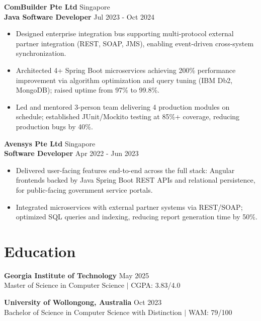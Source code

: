 \documentclass[10pt,a4paper]{article}
\newcommand{\resumeSubheading}[4]{
    {\sffamily\bfseries #1} \hfill {\small #2} \\
    \vspace{1pt}
    \textbf{#3} \hfill {\small #4}
}
\begin{document}
\resumeSubheading
{ComBuilder Pte Ltd}{Singapore}
{Java Software Developer}{Jul 2023 - Oct 2024}
\vspace{-6pt}
\begin{itemize}[leftmargin=0.18in, label={\textbullet}, itemsep=1pt, parsep=0pt, topsep=3pt]
    \item Designed enterprise integration bus supporting multi-protocol external partner integration (REST, SOAP, JMS), enabling event-driven cross-system synchronization.
    \item Architected 4+ Spring Boot microservices achieving 200\% performance improvement via algorithm optimization and query tuning (IBM Db2, MongoDB); raised uptime from 97\% to 99.8\%.
    \item Led and mentored 3-person team delivering 4 production modules on schedule; established JUnit/Mockito testing at 85\%+ coverage, reducing production bugs by 40\%.
\end{itemize}
\vspace{2pt}

\resumeSubheading
{Avensys Pte Ltd}{Singapore}
{Software Developer}{Apr 2022 - Jun 2023}
\vspace{-6pt}
\begin{itemize}[leftmargin=0.18in, label={\textbullet}, itemsep=1pt, parsep=0pt, topsep=3pt]
    \item Delivered user-facing features end-to-end across the full stack: Angular frontends backed by Java Spring Boot REST APIs and relational persistence, for public-facing government service portals.
    \item Integrated microservices with external partner systems via REST/SOAP; optimized SQL queries and indexing, reducing report generation time by 50\%.
\end{itemize}
\vspace{2pt}


\section{Education}
\vspace{-2pt}
\textbf{Georgia Institute of Technology} \hfill May 2025 \\
Master of Science in Computer Science $|$ CGPA: 3.83/4.0

\vspace{2pt}

\textbf{University of Wollongong, Australia} \hfill Oct 2023 \\
Bachelor of Science in Computer Science with Distinction $|$ WAM: 79/100
\end{document}
